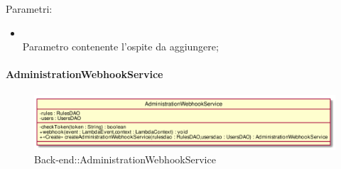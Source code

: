\begin{itemize}
\begin{itemize}
		Parametri:
		\begin{itemize}
			\item {} \\
			Parametro contenente l'ospite da aggiungere;
		\end{itemize}
	\end{itemize}
\end{itemize}

\hypertarget{AdministrationWebhookService_label}{\paragraph{AdministrationWebhookService}}
\begin{figure}[h]
	\centering
	\includegraphics[width=\textwidth,height=\textheight,keepaspectratio]{images/ClassAdministrationWebhookService.png}
	\caption{Back-end::AdministrationWebhookService}
\end{figure}
